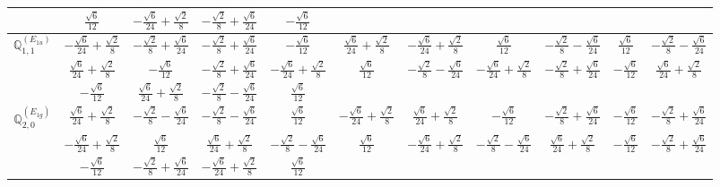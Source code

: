 \documentclass[fleqn,10pt,landscape]{article}
\begin{document}
\begin{itemize}
{\begin{center}
\begin{longtable}{ccccccccccc}
& $ \frac{\sqrt{6}}{12} $ & $ - \frac{\sqrt{6}}{24} + \frac{\sqrt{2}}{8} $ & $ - \frac{\sqrt{2}}{8} + \frac{\sqrt{6}}{24} $ & $ - \frac{\sqrt{6}}{12} $ & $  $ & $  $ & $  $ & $  $ & $  $ & $  $ \\ \hline
$\mathbb{Q}_{1,1}^{(E_{1u})}$ & $ - \frac{\sqrt{6}}{24} + \frac{\sqrt{2}}{8} $ & $ - \frac{\sqrt{2}}{8} + \frac{\sqrt{6}}{24} $ & $ - \frac{\sqrt{2}}{8} + \frac{\sqrt{6}}{24} $ & $ - \frac{\sqrt{6}}{12} $ & $ \frac{\sqrt{6}}{24} + \frac{\sqrt{2}}{8} $ & $ - \frac{\sqrt{6}}{24} + \frac{\sqrt{2}}{8} $ & $ \frac{\sqrt{6}}{12} $ & $ - \frac{\sqrt{2}}{8} - \frac{\sqrt{6}}{24} $ & $ \frac{\sqrt{6}}{12} $ & $ - \frac{\sqrt{2}}{8} - \frac{\sqrt{6}}{24} $ \\
& $ \frac{\sqrt{6}}{24} + \frac{\sqrt{2}}{8} $ & $ - \frac{\sqrt{6}}{12} $ & $ - \frac{\sqrt{2}}{8} + \frac{\sqrt{6}}{24} $ & $ - \frac{\sqrt{6}}{24} + \frac{\sqrt{2}}{8} $ & $ \frac{\sqrt{6}}{12} $ & $ - \frac{\sqrt{2}}{8} - \frac{\sqrt{6}}{24} $ & $ - \frac{\sqrt{6}}{24} + \frac{\sqrt{2}}{8} $ & $ - \frac{\sqrt{2}}{8} + \frac{\sqrt{6}}{24} $ & $ - \frac{\sqrt{6}}{12} $ & $ \frac{\sqrt{6}}{24} + \frac{\sqrt{2}}{8} $ \\
& $ - \frac{\sqrt{6}}{12} $ & $ \frac{\sqrt{6}}{24} + \frac{\sqrt{2}}{8} $ & $ - \frac{\sqrt{2}}{8} - \frac{\sqrt{6}}{24} $ & $ \frac{\sqrt{6}}{12} $ & $  $ & $  $ & $  $ & $  $ & $  $ & $  $ \\ \hline
$\mathbb{Q}_{2,0}^{(E_{1g})}$ & $ \frac{\sqrt{6}}{24} + \frac{\sqrt{2}}{8} $ & $ - \frac{\sqrt{2}}{8} - \frac{\sqrt{6}}{24} $ & $ - \frac{\sqrt{2}}{8} - \frac{\sqrt{6}}{24} $ & $ \frac{\sqrt{6}}{12} $ & $ - \frac{\sqrt{6}}{24} + \frac{\sqrt{2}}{8} $ & $ \frac{\sqrt{6}}{24} + \frac{\sqrt{2}}{8} $ & $ - \frac{\sqrt{6}}{12} $ & $ - \frac{\sqrt{2}}{8} + \frac{\sqrt{6}}{24} $ & $ - \frac{\sqrt{6}}{12} $ & $ - \frac{\sqrt{2}}{8} + \frac{\sqrt{6}}{24} $ \\
& $ - \frac{\sqrt{6}}{24} + \frac{\sqrt{2}}{8} $ & $ \frac{\sqrt{6}}{12} $ & $ \frac{\sqrt{6}}{24} + \frac{\sqrt{2}}{8} $ & $ - \frac{\sqrt{2}}{8} - \frac{\sqrt{6}}{24} $ & $ \frac{\sqrt{6}}{12} $ & $ - \frac{\sqrt{6}}{24} + \frac{\sqrt{2}}{8} $ & $ - \frac{\sqrt{2}}{8} - \frac{\sqrt{6}}{24} $ & $ \frac{\sqrt{6}}{24} + \frac{\sqrt{2}}{8} $ & $ - \frac{\sqrt{6}}{12} $ & $ - \frac{\sqrt{2}}{8} + \frac{\sqrt{6}}{24} $ \\
& $ - \frac{\sqrt{6}}{12} $ & $ - \frac{\sqrt{2}}{8} + \frac{\sqrt{6}}{24} $ & $ - \frac{\sqrt{6}}{24} + \frac{\sqrt{2}}{8} $ & $ \frac{\sqrt{6}}{12} $ & $  $ & $  $ & $  $ & $  $ & $  $ & $  $ \\ \hline

\end{longtable}
\end{center}}
\end{itemize}
\end{document}
